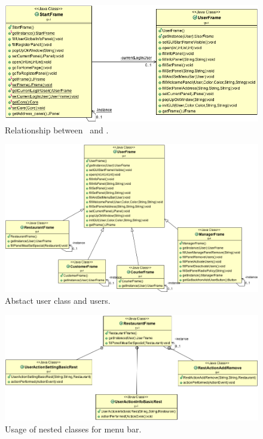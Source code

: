 \begin{figure}
  \begin{center}
    \includegraphics[scale=0.57]{./img/StartFrameToUserFrame.png}
    \end{center}
  \caption{Relationship between \StFra~and \UserF.}
  \label{fig:start2user_uml}
\end{figure}
\begin{figure}
  \begin{center}
    \includegraphics[scale=0.47]{./img/GUI_UserFrame_to_Users.png}
    \end{center}
  \caption{Abstact user class and users.}
  \label{fig:userframe2users_uml}
\end{figure}
\begin{figure}
  \begin{center}
    \includegraphics[scale=0.47]{./img/RestaurantFrame_NestedClasses.png}
    \end{center}
  \caption{Usage of nested classes for menu bar.}
  \label{fig:restaurantNestedClass_uml}
\end{figure}
